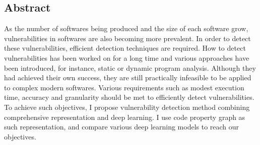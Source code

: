 \subsection*{Abstract}


As the number of softwares being produced and the size of each software grow, vulnerabilities in softwares are also becoming more prevalent.
In order to detect these vulnerabilities, efficient detection techniques are required.
How to detect vulnerabilities has been worked on for a long time and various approaches have been introduced, for instance, static or dynamic program analysis.
Although they had achieved their own success, they are still practically infeasible to be applied to complex modern softwares.
Various requirements such as modest execution time, accuracy and granularity should be met to efficiently detect vulnerabilities.
To achieve such objectives, I propose vulnerability detection method combining comprehensive representation and deep learning.
I use code property graph as such representation, and compare various deep learning models to reach our objectives.
